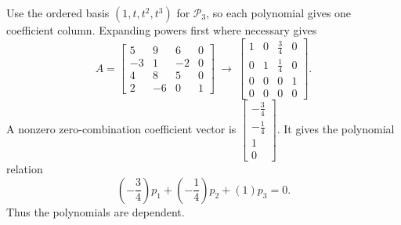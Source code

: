 Use the ordered basis $(1,t,t^2,t^3)$ for $\mathcal P_3$, so each polynomial gives one coefficient column. Expanding powers first where necessary gives
\[A=\left[\begin{array}{rrrr}5&9&6&0\\-3&1&-2&0\\4&8&5&0\\2&-6&0&1\end{array}\right]\ \longrightarrow\ \left[\begin{array}{rrrr}1&0&\frac{3}{4}&0\\0&1&\frac{1}{4}&0\\0&0&0&1\\0&0&0&0\end{array}\right].\]
A nonzero zero-combination coefficient vector is $\left[\begin{array}{r}- \frac{3}{4}\\- \frac{1}{4}\\1\\0\end{array}\right]$. It gives the polynomial relation
\[(- \frac{3}{4})p_{1}+(- \frac{1}{4})p_{2}+(1)p_{3}=0.\]
Thus the polynomials are dependent.

